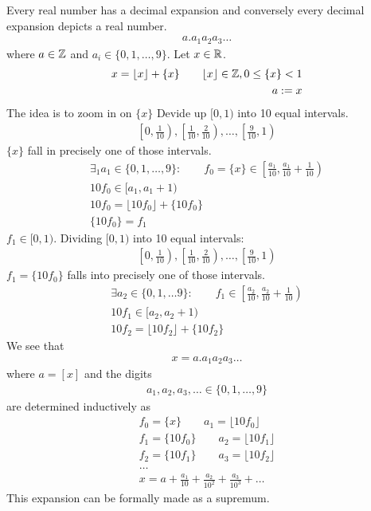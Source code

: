 Every real number has a decimal expansion and conversely every decimal expansion depicts a real number.
\begin{align*}
a.a_1 a_2 a_3 \dots 
\end{align*}
where $a \in \mathbb Z$ and $a_i \in \{0,1, \dots, 9\}$. Let $x \in \mathbb R$.
\begin{align*}
x = \lfloor x \rfloor + \{x\} \qquad \lfloor x \rfloor \in \mathbb Z, 0 \le \{x\} < 1 \\
a:=x
\end{align*}
The idea is to zoom in on $\{x\}$ Devide up $[0,1)$ into 10 equal intervals.
\begin{align*}
\left[0, \frac 1 {10} \right), \left[\frac 1 {10}, \frac 2 {10} \right), \dots, \left[\frac 9 {10}, 1 \right)
\end{align*}
$\{x\}$ fall in precisely one of those intervals. %
\begin{align*}
\exists_1 a_1 \in \{0,1, \dots, 9\}: \qquad f_0 = \{x\} \in \left[ \frac{a_1} {10}, \frac{a_1}{10} + \frac 1 {10} \right) \\
10 f_0 \in [a_1, a_1+1) \\
10f_0 = \lfloor 10 f_0 \rfloor + \{10 f_0\} \\
\{10 f_0\} = f_1
\end{align*}
$f_1 \in [0,1)$. Dividing $[0,1)$ into 10 equal intervals:
\begin{align*}
\left[0, \frac 1 {10} \right), \left[\frac 1 {10}, \frac 2 {10} \right), \dots, \left[\frac 9 {10}, 1 \right)
\end{align*}
$f_1 = \{ 10 f_0 \}$ falls into precisely one of those intervals. %
\begin{align*}
\exists a_2 \in \{0,1, \dots 9\}: \qquad f_1 \in \left[ \frac{a_2} {10}, \frac{a_2}{10} + \frac 1 {10} \right) \\
10 f_1 \in [a_2, a_2+1) \\
10f_2 = \lfloor 10 f_2 \rfloor + \{ 10 f_2 \}
\end{align*}
We see that 
\begin{align*}
x = a.a_1 a_2 a_3 \dots
\end{align*}
where $a = [x]$ and the digits 
\begin{align*}
a_1, a_2, a_3, \dots \in \{0,1, \dots, 9 \}
\end{align*}
are determined inductively as
\begin{align*}
f_0 = \{x\} \qquad a_1 = \lfloor 10 f_0 \rfloor \\
f_1 = \{10 f_0\} \qquad a_2 = \lfloor 10 f_1 \rfloor \\
f_2 = \{10 f_1\} \qquad a_3 = \lfloor 10 f_2 \rfloor \\
\dots \\
x = a + \frac{a_1}{10} + \frac{a_2}{10^2} + \frac{a_3}{10^3} + \dots
\end{align*}
This expansion can be formally made as a supremum.

